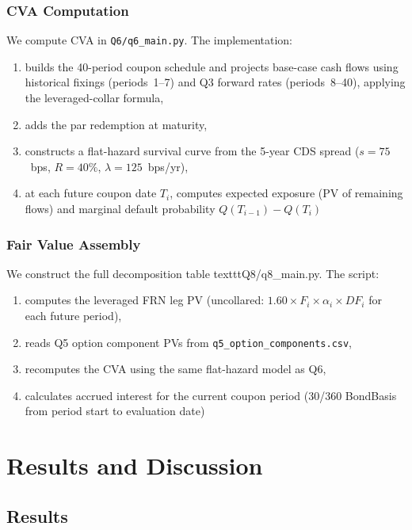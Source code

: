 \documentclass[11pt,a4paper]{article}
\newcommand{\EUR}[1]{\texteuro{#1}}  %
\begin{document}
\subsubsection{CVA Computation}
\label{sssec:cva_impl}

We compute CVA in \texttt{Q6/q6\_main.py}.
The implementation:
\begin{enumerate}\setlength{\itemsep}{1pt}
  \item builds the 40-period coupon schedule and projects base-case cash
    flows using historical fixings (periods~1--7) and Q3 forward rates
    (periods~8--40), applying the leveraged-collar formula,
  \item adds the \EUR{1,000} par redemption at maturity,
  \item constructs a flat-hazard survival curve from the 5-year CDS spread
    ($s = 75$~bps, $R=40\%$, $\lambda=125$~bps/yr),
  \item at each future coupon date $T_i$, computes expected exposure
    (PV of remaining flows) and marginal default probability
    $Q(T_{i-1})-Q(T_i)$
\end{enumerate}

\subsubsection{Fair Value Assembly}
\label{sssec:q8_impl}

We construct the full decomposition table texttt{Q8/q8\_main.py}.
The script:
\begin{enumerate}\setlength{\itemsep}{1pt}
  \item computes the leveraged FRN leg PV (uncollared: $1.60 \times F_i
    \times \alpha_i \times DF_i$ for each future period),
  \item reads Q5 option component PVs from
    \texttt{q5\_option\_components.csv},
  \item recomputes the CVA using the same flat-hazard model as Q6,
  \item calculates accrued interest for the current coupon period
    (30/360 BondBasis from period start to evaluation date)
\end{enumerate}


\section{Results and Discussion}

\subsection{Results}
\end{document}
